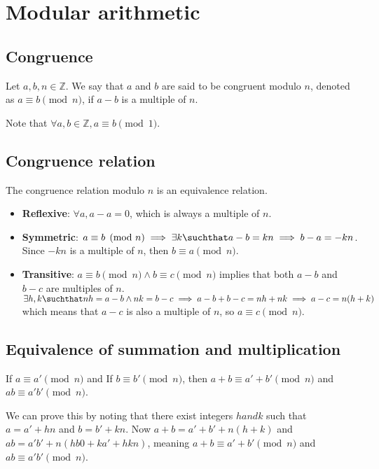 \documentclass[preview]{standalone}
\begin{document}

\pagebreak

\section{Modular arithmetic}

\subsection{Congruence}

Let \(a,b,n\in\mathbb{Z}\).
We say that \(a\) and \(b\) are said to be congruent modulo \(n\),
denoted as \(a \equiv b \pmod{n}\), if \(a-b\) is a multiple of \(n\).

Note that \(\forall a,b \in \mathbb{Z}, a \equiv b \pmod{1}\).

\subsection{Congruence relation}

The congruence relation modulo \(n\) is an equivalence relation.

\begin{itemize}
    \item \textbf{Reflexive}: \(\forall a, a-a = 0\), which is always a multiple of \(n\).
    \item \textbf{Symmetric}: \(a \equiv b \pmod{n} \implies \exists k \suchthat a-b=kn \implies b-a=-kn\).
    Since \(-kn\) is a multiple of \(n\), then \(b \equiv a \pmod{n}\).
    \item \textbf{Transitive}: \(a \equiv b \pmod{n} \land b \equiv c \pmod{n}\) implies that both
    \(a-b\) and \(b - c\) are multiples of \(n\).
    \(\exists h, k \suchthat nh=a-b \land nk=b-c \implies a-b+b-c=nh+nk \implies a-c=n(h+k)\)
    which means that \(a-c\) is also a multiple of \(n\), so \(a \equiv c \pmod{n}\).
\end{itemize}

\subsection{Equivalence of summation and multiplication}

If \(a \equiv a' \pmod{n}\) and If \(b \equiv b' \pmod{n}\), then
\(a+b \equiv a' + b' \pmod{n}\) and \(ab \equiv a'b' \pmod{n}\).

We can prove this by noting that there exist integers \(h and k\) such that
\(a=a'+hn\) and \(b=b'+kn\).
Now \(a+b = a'+b'+n(h+k)\) and \(ab=a'b' + n(hb0+ka'+hkn)\), meaning
\(a+b \equiv a' + b' \pmod{n}\) and \(ab \equiv a'b' \pmod{n}\).
\end{document}
